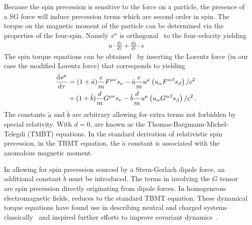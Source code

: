 Because the spin precession is sensitive to the force on a particle, the presence of a SG force will induce precession terms which are second order in spin. The torque on the magnetic moment of the particle can be determined via the properties of the four-spin. Namely $s^{\alpha}$ is orthogonal~\citep{schwinger1974spin} to the four-velocity yielding
\begin{gather}
    \label{bpot:4}
    u\cdot\frac{ds}{d\tau}+\frac{du}{d\tau}\cdot s
\end{gather}
The spin torque equations can be obtained~\citep{Bargmann:1959gz} by inserting the Lorentz force (in our case the modified Lorentz force) that corresponds to  yielding
\begin{alignat}{1}
  \notag\frac{\mathrm{d}s^{\mu}}{\mathrm{d}\tau}&=(1+\tilde{a})\frac{e}{m}F^{\mu\nu}s_{\nu}-\tilde{a}\frac{e}{m}u^{\mu}\left(u_{\alpha}F^{\alpha\beta}s_{\beta}\right)/c^{2}\\
  \label{LSG03}&+(1+\tilde{b})\frac{d}{m}G^{\mu\nu}s_{\nu}-\tilde{b}\frac{d}{m}u^{\mu}\left(u_{\alpha}G^{\alpha\beta}s_{\beta}\right)/c^{2}\,.
\end{alignat}
The constants $\tilde{a}$ and $\tilde{b}$ are arbitrary allowing for extra terms not forbidden by special relativity. With $d=0$,  are known as the Thomas-Bargmann-Michel-Telegdi (TMBT) equations. In the standard derivation of relativistic spin precession, in the TBMT equation, the $\tilde{a}$ constant is associated with the anomalous magnetic moment.

In allowing for spin precession sourced by a Stern-Gerlach dipole force, an additional constant $\tilde{b}$ must be introduced. The terms in  involving the $G$ tensor are spin precession directly originating from dipole forces. In homogeneous electromagnetic fields,  reduces to the standard TBMT equation. These dynamical torque equations have found use in describing neutral and charged systems classically~\citep{Formanek:2021mcp,Formanek:2019cga} and inspired further efforts to improve covariant dynamics~\citep{Formanek:2020ojr}.

